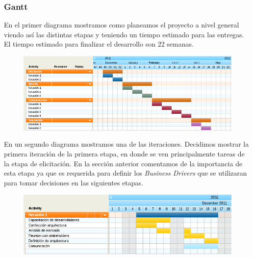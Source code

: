 \subsubsection{Gantt}

En el primer diagrama mostramos como planeamos el proyecto a nivel general viendo así las distintas etapas y teniendo un tiempo estimado para las entregas. El tiempo estimado para
finalizar el desarrollo son 22 semanas.	

\begin{figure}[H]
 \includegraphics[scale=0.7]{./ganttetapas.png}
\end{figure}

En un segundo diagrama mostramos una de las iteraciones. Decidimos mostrar la primera iteración de la primera etapa, en donde se ven principalmente tareas de la etapa de elicitación. En la sección anterior comentamos de la importancia de esta etapa ya que es requerida para definir los \emph{Business Drivers} que se utilizaran para tomar decisiones en las siguientes etapas.

\begin{figure}[H]
\begin{center}
 \includegraphics[scale=0.7]{./ganttiteracion.png}
\end{center}
\end{figure}

\renewcommand{\labelitemi}{$\tiny \blacksquare$}

